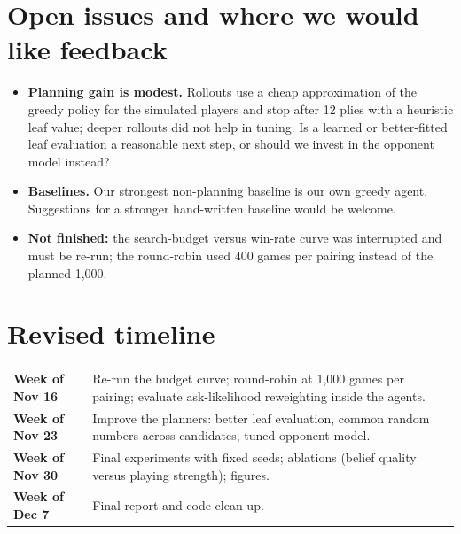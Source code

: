 \documentclass[10pt]{article}
\begin{document}
\section*{Open issues and where we would like feedback}
\begin{itemize}
  \item \textbf{Planning gain is modest.} Rollouts use a cheap approximation of the greedy policy
    for the simulated players and stop after 12 plies with a heuristic leaf value; deeper rollouts
    did not help in tuning. Is a learned or better-fitted leaf evaluation a reasonable next step, or
    should we invest in the opponent model instead?
  \item \textbf{Baselines.} Our strongest non-planning baseline is our own greedy agent.
    Suggestions for a stronger hand-written baseline would be welcome.
  \item \textbf{Not finished:} the search-budget versus win-rate curve was interrupted and must be
    re-run; the round-robin used 400 games per pairing instead of the planned 1,000.
\end{itemize}

\section*{Revised timeline}
\begin{tabular}{@{}lp{5.7in}@{}}
\textbf{Week of Nov 16} & Re-run the budget curve; round-robin at 1,000 games per pairing; evaluate
  ask-likelihood reweighting inside the agents. \\
\textbf{Week of Nov 23} & Improve the planners: better leaf evaluation, common random numbers
  across candidates, tuned opponent model. \\
\textbf{Week of Nov 30} & Final experiments with fixed seeds; ablations (belief quality versus
  playing strength); figures. \\
\textbf{Week of Dec 7}  & Final report and code clean-up. \\
\end{tabular}
\end{document}
